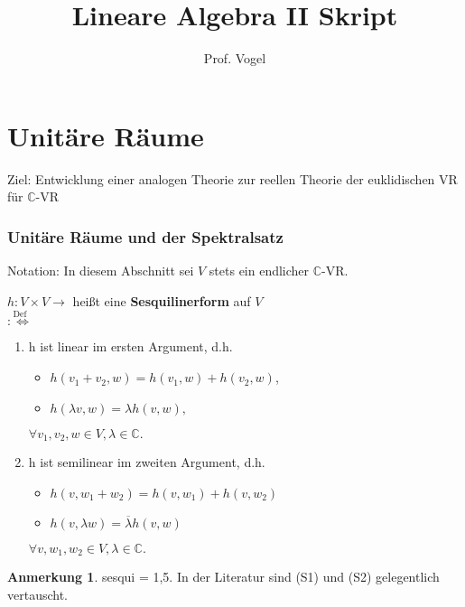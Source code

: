\documentclass[a4paper, titlepage]{article}
\title{Lineare Algebra II Skript}
\author{Prof. Vogel}
\theoremstyle{definition}
\newtheorem*{anm}{Anmerkung}
\newcommand{\C}{\mathbb{C}}
\begin{document}
\maketitle
\tableofcontents
\newpage
\part{Unitäre Räume}
	Ziel: Entwicklung einer analogen Theorie zur reellen Theorie der euklidischen VR für $\C$-VR
\section{Unitäre Räume und der Spektralsatz}
	Notation: In diesem Abschnitt sei $V$ stets ein endlicher $\C$-VR.
\begin{definition}
	$h: V \times V \longrightarrow $ heißt eine \textbf{Sesquilinerform} auf $V$\\ $\overset{\text{Def}}{:\Leftrightarrow}$
	\begin{enumerate}[(S1)]
		\item h ist linear im ersten Argument, d.h.
	\begin{itemize}
			\item $h(v_1 + v_2, w) = h(v_1, w) + h(v_2,w)$,
			\item $h(\lambda v, w) = \lambda h(v,w), $
	\end{itemize}
	$\forall v_1, v_2, w \in V, \lambda \in \C.$
	\item h ist semilinear im zweiten Argument, d.h.
		\begin{itemize}
			\item $h(v, w_1 +w_2) = h(v, w_1) + h(v, w_2)$
			\item $h(v, \lambda w) = \overline{\lambda} h(v,w) $
		\end{itemize}
	$\forall v, w_1 ,w_2 \in V, \lambda \in \C.$		
\end{enumerate} 
\end{definition}
\begin{anm}
sesqui = 1,5.
In der Literatur sind (S1) und (S2) gelegentlich vertauscht.
\end{anm}
\end{document}
